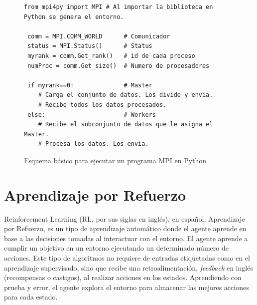 	\vspace{-0.2cm}
	
	\vspace{-0.1cm}

	\begin{figure}[!h]
		
		\begin{lstlisting}[frame=single]
 from mpi4py import MPI # Al importar la biblioteca en Python se genera el entorno.

 comm = MPI.COMM_WORLD     	# Comunicador
 status = MPI.Status()   	# Status
 myrank = comm.Get_rank() 	# id de cada proceso
 numProc = comm.Get_size() 	# Numero de procesadores

 if myrank==0:           	# Master
    # Carga el conjunto de datos. Los divide y envia.
    # Recibe todos los datos procesados.
 else:                   	# Workers
    # Recibe el subconjunto de datos que le asigna el Master.
    # Procesa los datos. Los envia.
		\end{lstlisting}
		\caption{Esquema básico para ejecutar un programa MPI en Python}
		\label{fig:esquema_mpi}
	\end{figure}
	
	\newpage

\section{Aprendizaje por Refuerzo}
\label{cap:2_2}
	Reinforcement Learning (RL, por sus siglas en inglés), en español, Aprendizaje por Refuerzo, es un tipo de aprendizaje automático donde el agente aprende en base a las decisiones tomadas al interactuar con el entorno. El agente aprende a cumplir un objetivo en un entorno ejecutando un determinado número de acciones. Este tipo de algoritmos no requiere de entradas etiquetadas como en el aprendizaje supervisado, sino que recibe una retroalimentación, \textit{feedback} en inglés (recompensas o castigos), al realizar acciones en los estados. Aprendiendo con prueba y error, el agente explora el entorno para almacenar las mejores acciones para cada estado. 

